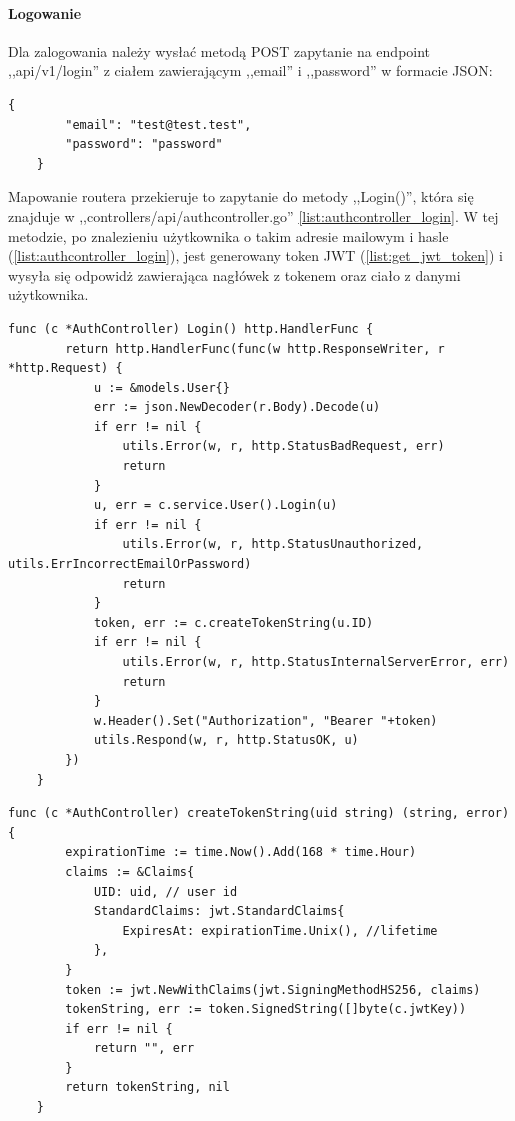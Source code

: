 \paragraph{Logowanie}
\newline
Dla zalogowania należy wysłać metodą POST zapytanie na endpoint ,,api/v1/login'' z ciałem zawierającym ,,email'' i ,,password'' w formacie JSON:
\begin{lstlisting}[basicstyle=\tiny\ttfamily]
    {
        "email": "test@test.test",
        "password": "password"
    }
\end{lstlisting}

Mapowanie routera przekieruje to zapytanie do metody ,,Login()'', która się znajduje w ,,controllers/api/authcontroller.go'' \ref{list:authcontroller_login}.
W tej metodzie, po znalezieniu użytkownika o takim adresie mailowym i hasle (\ref{list:authcontroller_login}), jest generowany token JWT (\ref{list:get_jwt_token}) i wysyła się odpowidż zawierająca nagłówek z tokenem oraz ciało z danymi użytkownika.
\begin{lstlisting}[label=list:authcontroller_login,caption=Kontroller logowania użytkownika,basicstyle=\tiny\ttfamily]
    func (c *AuthController) Login() http.HandlerFunc {
        return http.HandlerFunc(func(w http.ResponseWriter, r *http.Request) {
            u := &models.User{}
            err := json.NewDecoder(r.Body).Decode(u)
            if err != nil {
                utils.Error(w, r, http.StatusBadRequest, err)
                return
            }
            u, err = c.service.User().Login(u)
            if err != nil {
                utils.Error(w, r, http.StatusUnauthorized, utils.ErrIncorrectEmailOrPassword)
                return
            }
            token, err := c.createTokenString(u.ID)
            if err != nil {
                utils.Error(w, r, http.StatusInternalServerError, err)
                return
            }
            w.Header().Set("Authorization", "Bearer "+token)
            utils.Respond(w, r, http.StatusOK, u)
        })
    }
\end{lstlisting}

\begin{lstlisting}[label=list:get_jwt_token,caption=Generacja JWT tokena,basicstyle=\tiny\ttfamily]
    func (c *AuthController) createTokenString(uid string) (string, error) {
        expirationTime := time.Now().Add(168 * time.Hour)
        claims := &Claims{
            UID: uid, // user id
            StandardClaims: jwt.StandardClaims{
                ExpiresAt: expirationTime.Unix(), //lifetime
            },
        }
        token := jwt.NewWithClaims(jwt.SigningMethodHS256, claims)
        tokenString, err := token.SignedString([]byte(c.jwtKey))
        if err != nil {
            return "", err
        }
        return tokenString, nil
    }
\end{lstlisting}

